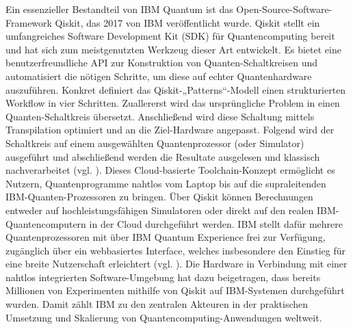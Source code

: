 \vspace{0.5em}

Ein essenzieller Bestandteil von IBM Quantum ist das Open-Source-Software-Framework Qiskit, das 2017 von IBM veröffentlicht wurde. Qiskit stellt ein umfangreiches Software Development Kit (SDK) für Quantencomputing bereit und hat sich zum meistgenutzten Werkzeug dieser Art entwickelt. Es bietet eine benutzerfreundliche API zur Konstruktion von Quanten-Schaltkreisen und automatisiert die nötigen Schritte, um diese auf echter Quantenhardware auszuführen. Konkret definiert das Qiskit-„Patterns“-Modell einen strukturierten Workflow in vier Schritten. Zuallererst wird das ursprüngliche Problem in einen Quanten-Schaltkreis übersetzt. Anschließend wird diese Schaltung mittels Transpilation optimiert und an die Ziel-Hardware angepasst. Folgend wird der Schaltkreis auf einem ausgewählten Quantenprozessor (oder Simulator) ausgeführt und abschließend werden die Resultate ausgelesen und klassisch nachverarbeitet (vgl. \cite{abughanemIBMQuantumComputers2025}). Dieses Cloud-basierte Toolchain-Konzept ermöglicht es Nutzern, Quantenprogramme nahtlos vom Laptop bis auf die supraleitenden IBM-Quanten-Prozessoren zu bringen. Über Qiskit können Berechnungen entweder auf hochleistungsfähigen Simulatoren oder direkt auf den realen IBM-Quantencomputern in der Cloud durchgeführt werden. IBM stellt dafür mehrere Quantenprozessoren mit über IBM Quantum Experience frei zur Verfügung, zugänglich über ein webbasiertes Interface, welches insbesondere den Einstieg für eine breite Nutzerschaft erleichtert (vgl. \cite{wangAdvantagesTwoQuantum2025}). Die Hardware in Verbindung mit einer nahtlos integrierten Software-Umgebung hat dazu beigetragen, dass bereits Millionen von Experimenten mithilfe von Qiskit auf IBM-Systemen durchgeführt wurden. Damit zählt IBM zu den zentralen Akteuren in der praktischen Umsetzung und Skalierung von Quantencomputing-Anwendungen weltweit.

\vspace{0.5em}

